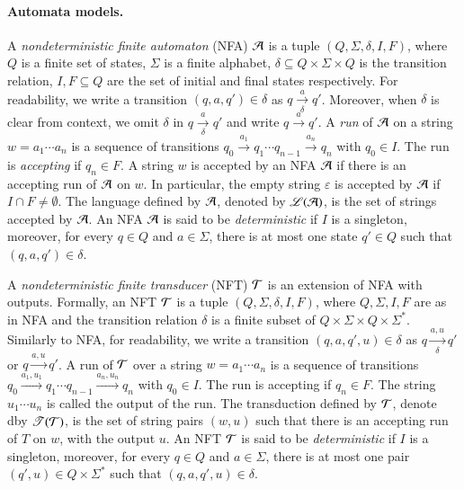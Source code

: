 \paragraph*{Automata models.} A \emph{nondeterministic finite automaton} (NFA) $\mathcal{A}$ is a tuple $(Q, \Sigma, \delta, I, F)$, where $Q$ is a finite set of states, $\Sigma$ is a finite alphabet, $\delta \subseteq Q \times \Sigma \times Q$ is the transition relation, $I,F \subseteq Q$ are the set of initial and final states respectively. For readability, we write a transition $(q, a, q') \in \delta$ as $q \xrightarrow[\delta]{a} q'$. Moreover, when $\delta$ is clear from context, we omit $\delta$ in $q \xrightarrow[\delta]{a} q'$ and write $q \xrightarrow{a} q'$.
%
A \emph{run} of $\mathcal{A}$ on a string $w = a_1 \cdots a_n$ is a sequence of transitions $q_0 \xrightarrow{a_1} q_1 \cdots q_{n-1} \xrightarrow{a_n} q_n$ with $q_0 \in I$. The run is \emph{accepting} if $q_n \in F$.
A string $w$ is accepted by an NFA $\mathcal{A}$ if there is an accepting run of $\mathcal{A}$ on $w$. In particular, the empty string $\varepsilon$ is accepted by $\mathcal{A}$ if $I \cap F \neq \emptyset$. The language defined by $\mathcal{A}$, denoted by $\mathscr{L}(\mathcal{A})$, is the set of strings accepted by $\mathcal{A}$. An NFA $\mathcal{A}$ is said to be \emph{deterministic} if $I$ is a singleton, moreover, for every $q \in Q$ and $a \in \Sigma$, there is at most one state $q' \in Q$ such that $(q, a, q') \in \delta$.

 




A \emph{nondeterministic finite transducer} (NFT) $\mathcal{T}$ is an extension of NFA with outputs. Formally, an NFT $\mathcal{T}$ is a tuple $(Q, \Sigma, \delta, I, F)$, where $Q, \Sigma, I, F$ are as in NFA and the transition relation $\delta$ is a finite subset of $Q \times \Sigma \times Q \times \Sigma^*$. Similarly to NFA, for readability, we write a transition $(q, a, q', u) \in \delta$ as $q \xrightarrow[\delta]{a, u} q'$ or $q \xrightarrow{a, u} q'$. 
%
A run of $\mathcal{T}$ over a string $w=a_1 \cdots a_n$ is a sequence of transitions $q_0 \xrightarrow{a_1, u_1} q_1 \cdots q_{n-1} \xrightarrow{a_n, u_n} q_n$ with $q_0 \in I$. The run is accepting if $q_n \in F$. The string $u_1 \cdots u_n$ is called the output of the run. The transduction defined by $\mathcal{T}$, denote dby $\mathscr{T}(\mathcal{T})$, is the set of string pairs $(w, u)$ such that there is an accepting run of $T$ on $w$, with the output $u$. An NFT $\mathcal{T}$ is said to be \emph{deterministic} if $I$ is a singleton, moreover, for every $q \in Q$ and $a \in \Sigma$, there is at most one pair $(q', u) \in Q \times \Sigma^*$ such that $(q, a, q', u) \in \delta$.

